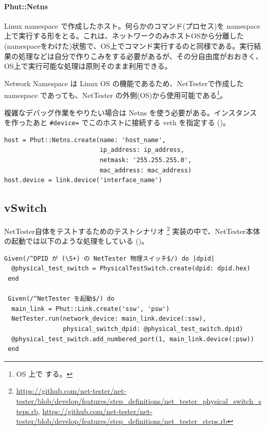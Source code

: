 \paragraph{Phut::Netns}
Linux namespace で作成したホスト。何らかのコマンド(プロセス)を namespace
上で実行する形をとる。これは、ネットワークのみホストOSから分離した
(namespaceをわけた)状態で、OS上でコマンド実行するのと同様である。実行結
果の処理などは自分で作りこみをする必要があるが、その分自由度がおおきく、
OS上で実行可能な処理は原則そのまま利用できる。

Network Namespace は Linux OS の機能であるため、NetTesterで作成した
namespace であっても、NetTester の外側(OS)から使用可能である\footnote{OS
上で  する。}。

複雑なデバッグ作業をやりたい場合は Netns を使う必要がある。インスタンス
を作ったあと \verb|#device=| でこのホストに接続する veth を指定する
()。

\begin{lstlisting}[caption=Phut::Netnsインスタンスの作成,label=lst:create-netns-instance]
host = Phut::Netns.create(name: 'host_name',
                          ip_address: ip_address,
                          netmask: '255.255.255.0',
                          mac_address: mac_address)
host.device = link.device('interface_name')
\end{lstlisting}

\subsection{vSwitch}

NetTester自体をテストするためのテストシナリオ
\footnote{\url{https://github.com/net-tester/net-tester/blob/develop/features/step_definitions/net_tester_physical_switch_steps.rb},
\url{https://github.com/net-tester/net-tester/blob/develop/features/step_definitions/net_tester_steps.rb}}
実装の中で、NetTester本体の起動では以下のような処理をしている
()。
\begin{lstlisting}[caption=NetTesterの起動,label=lst:run-nettester]
 Given(/^DPID が (\S+) の NetTester 物理スイッチ$/) do |dpid|
  @physical_test_switch = PhysicalTestSwitch.create(dpid: dpid.hex)
 end

 Given(/^NetTester を起動$/) do
  main_link = Phut::Link.create('ssw', 'psw')
  NetTester.run(network_device: main_link.device(:ssw),
                physical_switch_dpid: @physical_test_switch.dpid)
  @physical_test_switch.add_numbered_port(1, main_link.device(:psw))
 end
\end{lstlisting}


